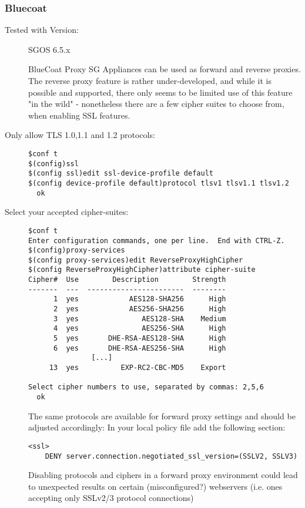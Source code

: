 \subsubsection{Bluecoat}
\begin{description}
\item[Tested with Version:] SGOS 6.5.x

BlueCoat Proxy SG Appliances can be used as forward and reverse proxies. The reverse proxy feature is rather under-developed, and while it is possible and supported, there only seems to be limited use of this feature "in the wild" - nonetheless there are a few cipher suites to choose from, when enabling SSL features.

\item[Only allow TLS 1.0,1.1 and 1.2 protocols:] \mbox{}

\begin{lstlisting}[breaklines]
$conf t
$(config)ssl
$(config ssl)edit ssl-device-profile default
$(config device-profile default)protocol tlsv1 tlsv1.1 tlsv1.2
  ok
\end{lstlisting}

\item[Select your accepted cipher-suites:] \mbox{}

\begin{lstlisting}[breaklines]
$conf t
Enter configuration commands, one per line.  End with CTRL-Z.
$(config)proxy-services
$(config proxy-services)edit ReverseProxyHighCipher
$(config ReverseProxyHighCipher)attribute cipher-suite
Cipher#  Use        Description        Strength
-------  ---  -----------------------  --------
      1  yes            AES128-SHA256      High
      2  yes            AES256-SHA256      High
      3  yes               AES128-SHA    Medium
      4  yes               AES256-SHA      High
      5  yes       DHE-RSA-AES128-SHA      High
      6  yes       DHE-RSA-AES256-SHA      High
               [...]
     13  yes          EXP-RC2-CBC-MD5    Export

Select cipher numbers to use, separated by commas: 2,5,6
  ok
\end{lstlisting}

The same protocols are available for forward proxy settings and should be adjusted accordingly:
In your local policy file add the following section:
\begin{lstlisting}[breaklines]
<ssl>
    DENY server.connection.negotiated_ssl_version=(SSLV2, SSLV3)
\end{lstlisting}

Disabling protocols and ciphers in a forward proxy environment could lead to unexpected results on certain (misconfigured?) webservers (i.e. ones accepting only SSLv2/3 protocol connections)

\end{description} 




